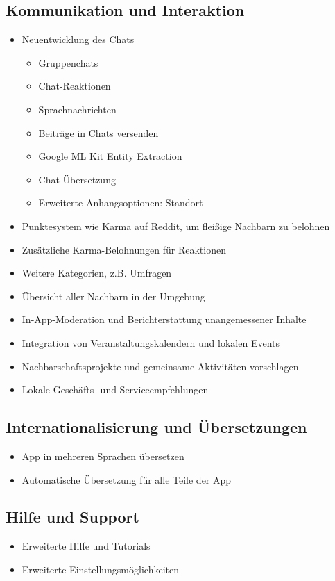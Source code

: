 \subsection{Kommunikation und Interaktion}
\begin{itemize}
    \item Neuentwicklung des Chats
          \begin{itemize}
              \item Gruppenchats
              \item Chat-Reaktionen
              \item Sprachnachrichten
              \item Beiträge in Chats versenden
              \item Google ML Kit Entity Extraction
              \item Chat-Übersetzung
              \item Erweiterte Anhangsoptionen: Standort
          \end{itemize}
    \item Punktesystem wie Karma auf Reddit, um fleißige Nachbarn zu belohnen
    \item Zusätzliche Karma-Belohnungen für Reaktionen
    \item Weitere Kategorien, z.B. Umfragen
    \item Übersicht aller Nachbarn in der Umgebung
    \item In-App-Moderation und Berichterstattung unangemessener Inhalte
    \item Integration von Veranstaltungskalendern und lokalen Events
    \item Nachbarschaftsprojekte und gemeinsame Aktivitäten vorschlagen
    \item Lokale Geschäfts- und Serviceempfehlungen
\end{itemize}

\subsection{Internationalisierung und Übersetzungen}
\begin{itemize}
    \item App in mehreren Sprachen übersetzen
    \item Automatische Übersetzung für alle Teile der App
\end{itemize}

\subsection{Hilfe und Support}
\begin{itemize}
    \item Erweiterte Hilfe und Tutorials
    \item Erweiterte Einstellungsmöglichkeiten
\end{itemize}


